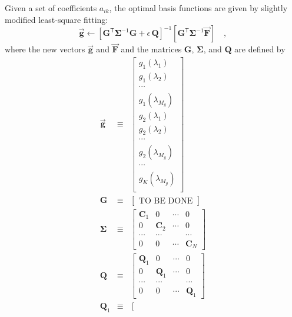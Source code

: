 \documentclass[12pt]{article}
\newcommand{\inverse}[1]{{#1}^{-1}}
\newcommand{\transpose}[1]{{#1}^{\mathsf{T}}}
\newcommand{\hoggvector}[1]{\boldsymbol{\vec{#1}}}
\newcommand{\Fvec}{\hoggvector{F}}
\newcommand{\gvec}{\hoggvector{g}}
\newcommand{\hoggmatrix}[1]{\boldsymbol{#1}}
\newcommand{\Cmatrix}{\hoggmatrix{C}}
\newcommand{\Gmatrix}{\hoggmatrix{G}}
\newcommand{\Qmatrix}{\hoggmatrix{Q}}
\newcommand{\Sigmamatrix}{\hoggmatrix{\Sigma}}
\begin{document}
Given a set of coefficients $a_{ik}$, the optimal basis functions are
given by slightly modified least-square fitting:
\begin{equation}
\gvec \leftarrow \inverse{\left[\transpose{\Gmatrix} \inverse{\Sigmamatrix} \Gmatrix
                                + \epsilon\,\Qmatrix \right]}
 \left[\transpose{\Gmatrix} \inverse{\Sigmamatrix} \Fvec\right]
\quad ,
\end{equation}
where the new vectors $\gvec$ and $\Fvec$ and the matrices $\Gmatrix$,
$\Sigmamatrix$, and $\Qmatrix$ are defined by
\begin{eqnarray}
\gvec & \equiv &
 \left[\begin{array}{c}
  g_1(\lambda_1) \\
  g_1(\lambda_2) \\
  \cdots \\
  g_1(\lambda_{M_g}) \\
  g_2(\lambda_1) \\
  g_2(\lambda_2) \\
  \cdots \\
  g_2(\lambda_{M_g}) \\
  \cdots \\
  g_K(\lambda_{M_g}) \\
 \end{array}\right]
 \nonumber\\
\Gmatrix & \equiv &
 \left[\begin{array}{c}
 \mbox{TO BE DONE}
 \end{array}\right]
 \nonumber\\
\Sigmamatrix & \equiv &
 \left[\begin{array}{cccc}
  \Cmatrix_1 & 0 & \cdots & 0 \\
  0 & \Cmatrix_2 & \cdots & 0 \\
  \cdots & \cdots & & \cdots  \\
  0 & 0 & \cdots & \Cmatrix_N
 \end{array}\right]
 \nonumber\\
\Qmatrix & \equiv &
 \left[\begin{array}{cccc}
  \Qmatrix_1 & 0 & \cdots & 0 \\
  0 & \Qmatrix_1 & \cdots & 0 \\
  \cdots & \cdots & & \cdots  \\
  0 & 0 & \cdots & \Qmatrix_1
 \end{array}\right]
 \nonumber\\
\Qmatrix_1 & \equiv &
 \left[\begin{array}{ccccccc}

\end{array}
\end{eqnarray}
\end{document}
